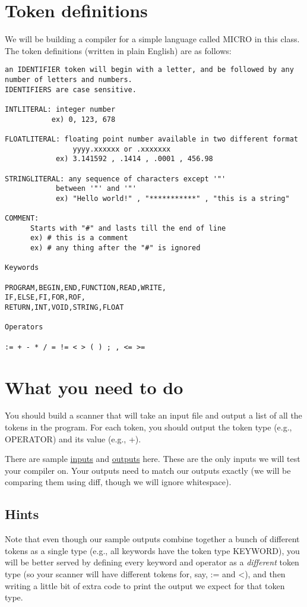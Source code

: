 \documentclass{article}
\begin{document}
\section{Token definitions}
We will be building a compiler for a simple language called MICRO in this class. The token definitions (written in plain English) are as follows:

\begin{lstlisting}[numbers=none]
an IDENTIFIER token will begin with a letter, and be followed by any number of letters and numbers. 
IDENTIFIERS are case sensitive.

INTLITERAL: integer number
           ex) 0, 123, 678

FLOATLITERAL: floating point number available in two different format
                yyyy.xxxxxx or .xxxxxxx
            ex) 3.141592 , .1414 , .0001 , 456.98

STRINGLITERAL: any sequence of characters except '"' 
            between '"' and '"' 
            ex) "Hello world!" , "***********" , "this is a string"

COMMENT:
      Starts with "#" and lasts till the end of line
      ex) # this is a comment
      ex) # any thing after the "#" is ignored 

Keywords

PROGRAM,BEGIN,END,FUNCTION,READ,WRITE,
IF,ELSE,FI,FOR,ROF,
RETURN,INT,VOID,STRING,FLOAT

Operators

:= + - * / = != < > ( ) ; , <= >=
\end{lstlisting}

\section{What you need to do}
You should build a scanner that will take an input file and output a list of all the tokens in the program. For each token, you should output the token type (e.g., \textsf{OPERATOR}) and its value (e.g., \textsf{+}).

There are sample \href{https://hegden.github.io/cs406/homeworks/PA1/inputs.zip}{inputs} and \href{https://hegden.github.io/cs406/homeworks/PA1/outputs.zip}{outputs} here. These are the only inputs we will test your compiler on. Your outputs need to match our outputs exactly (we will be comparing them using diff, though we will ignore whitespace).

\subsection{Hints}
Note that even though our sample outputs combine together a bunch of different tokens as a single type (e.g., all keywords have the token type \textsf{KEYWORD}), you will be better served by defining every keyword and operator as a {\em different} token type (so your scanner will have different tokens for, say, \textsf{:=} and \textsf{<}), and then writing a little bit of extra code to print the output we expect for that token type.
\end{document}
